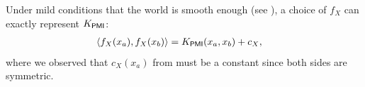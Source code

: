 \documentclass{article}
\theoremstyle{plain}
\theoremstyle{definition}
\theoremstyle{remark}
\begin{document}






Under mild conditions that the world is smooth enough (see ), a choice of $f_X$ can exactly represent $K_\mathsf{PMI}$:
\begin{align}
    \langle f_X(x_a), f_X(x_b) \rangle &= K_\mathsf{PMI}(x_a,x_b) + c_X,
\end{align}
where we observed that $c_X(x_a)$ from  must be a constant since both sides are symmetric.
% 
\end{document}
